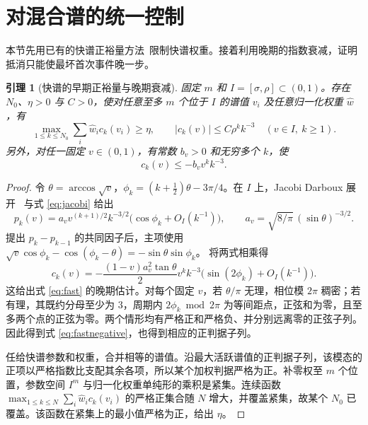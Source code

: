 \documentclass[11pt,a4paper,UTF8,fontset=fandol]{ctexart}
\newtheorem{lemma}[theorem]{引理}
\begin{document}
\section{对混合谱的统一控制}
本节先用已有的快谱正裕量方法~\cite[第 3 节]{archive}限制快谱权重。接着利用晚期的指数衰减，证明抵消只能使最坏首次事件晚一步。
\begin{lemma}[快谱的早期正裕量与晚期衰减]\label{lem:fast}
固定 \(m\) 和 \(I=[\sigma,\rho]\subset(0,1)\)。存在 \(N_0\)、\(\eta>0\) 与 \(C>0\)，使对任意至多 \(m\) 个位于 \(I\) 的谱值 \(v_i\) 及任意归一化权重 \(\widehat w\)，有
\begin{equation}
 \max_{1\le k\le N_0}\sum_i\widehat w_i c_k(v_i)\ge\eta,\qquad
 |c_k(v)|\le C\rho^k k^{-3}\quad(v\in I,\ k\ge1).
 \label{eq:fast}
\end{equation}
另外，对任一固定 \(v\in(0,1)\)，有常数 \(b_v>0\) 和无穷多个 \(k\)，使
\begin{equation}
 c_k(v)\le-b_v v^k k^{-3}.
 \label{eq:fastnegative}
\end{equation}
\end{lemma}
\begin{proof}
令 \(\theta=\arccos\sqrt v\)，\(\phi_k=(k+\tfrac12)\theta-3\pi/4\)。在 \(I\) 上，Jacobi Darboux 展开~\cite[式 18.15.4\_5]{dlmf} 与式 \eqref{eq:jacobi} 给出
\[
 p_k(v)=a_v v^{(k+1)/2} k^{-3/2}\bigl(\cos\phi_k+O_I(k^{-1})\bigr),
 \qquad a_v=\sqrt{8/\pi}\,(\sin\theta)^{-3/2}.
\]
提出 \(p_k-p_{k-1}\) 的共同因子后，主项使用
\(\sqrt v\cos\phi_k-\cos(\phi_k-\theta)=-\sin\theta\sin\phi_k\)。
将两式相乘得
\[
 c_k(v)=-\frac{(1-v)a_v^2\tan\theta}{2}
 v^k k^{-3}\bigl(\sin(2\phi_k)+O_I(k^{-1})\bigr).
\]
这给出式 \eqref{eq:fast} 的晚期估计。对每个固定 \(v\)，若 \(\theta/\pi\) 无理，相位模 \(2\pi\) 稠密；若有理，其既约分母至少为 \(3\)，周期内 \(2\phi_k\bmod 2\pi\) 为等间距点，正弦和为零，且至多两个点的正弦为零。两个情形均有严格正和严格负、并分别远离零的正弦子列。因此得到式 \eqref{eq:fastnegative}，也得到相应的正判据子列。

任给快谱参数和权重，合并相等的谱值。沿最大活跃谱值的正判据子列，该模态的正项以严格指数比支配其余各项，所以某个加权判据严格为正。补零权至 \(m\) 个位置，参数空间 \(I^m\) 与归一化权重单纯形的乘积是紧集。连续函数
\(\max_{1\le k\le N}\sum_i\widehat w_i c_k(v_i)\) 的严格正集合随 \(N\) 增大，并覆盖紧集，故某个 \(N_0\) 已覆盖。该函数在紧集上的最小值严格为正，给出 \(\eta\)。
\end{proof}
\end{document}
